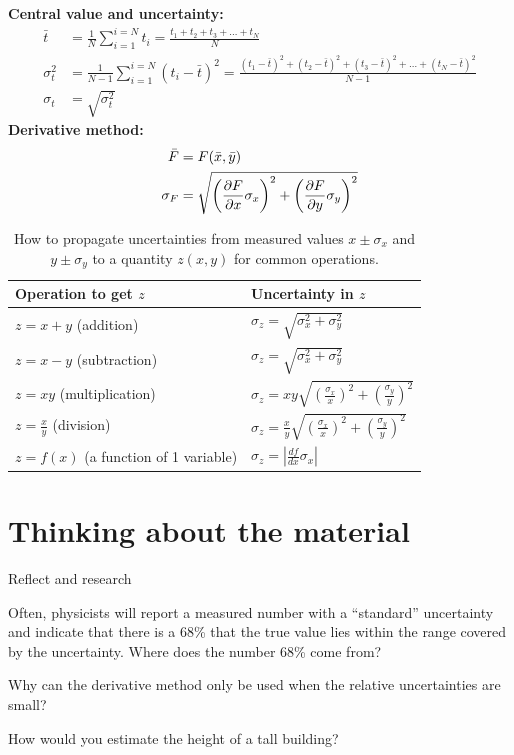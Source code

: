 \begin{importantEquations}
\textbf{Central value and uncertainty:}\\
\begin{align*}
\bar t &= \frac{1}{N}\sum_{i=1}^{i=N} t_i=\frac{t_1 +t_2 +t_3 +\dots+ t_N}{N} \\
\sigma_t^2 &=\frac{1}{N-1}\sum_{i=1}^{i=N}(t_i-\bar t)^2 = \frac{(t_1-\bar t)^2+(t_2-\bar t)^2+(t_3-\bar t)^2+\dots+(t_N-\bar t)^2}{N-1} \\
\sigma_t &=\sqrt{\sigma_t^2}
\end{align*}
\textbf{Derivative method:}\\
\begin{align*}
\bar F &= F(\bar x, \bar y) \nonumber \\
\sigma_F &= \sqrt{\left(\frac{\partial F}{\partial x}\sigma_x \right)^2 + \left(\frac{\partial F}{\partial y}\sigma_y \right)^2 }
\end{align*}
\begin{table}[H]
\centering
\begin{tabular}{ll}
\textbf{Operation to get $z$} &\textbf{Uncertainty in $z$} \\
\hline
\hline
$z=x+y$ (addition) &  $\sigma_z=\sqrt{\sigma_x^2+\sigma_y^2}$ \\ \hline
$z=x-y$ (subtraction) & $\sigma_z=\sqrt{\sigma_x^2+\sigma_y^2}$ \\ \hline
$z=xy$ (multiplication) & $\sigma_z=xy\sqrt{\left(\frac{\sigma_x}{x}\right)^2+\left(\frac{\sigma_y}{y}\right)^2}$ \\ \hline
$z=\frac{x}{y}$ (division) & $\sigma_z=\frac{x}{y}\sqrt{\left(\frac{\sigma_x}{x}\right)^2+\left(\frac{\sigma_y}{y}\right)^2}$ \\ \hline
$z=f(x)$ (a function of 1 variable) &$\sigma_z=\left|\frac{df}{dx}\sigma_x \right|$ \\ \hline
\end{tabular}
\caption{\label{tab:modelandexperiment:prop_uncertainties} How to propagate uncertainties from measured values $x\pm\sigma_x$ and $y\pm\sigma_y$ to a quantity $z(x,y)$ for common operations.}
\end{table}
\end{importantEquations}
\newpage
\section{Thinking about the material}

\vspace{0.5cm}
\begin{chapteractivity}{Reflect and research}
{
\item Often, physicists will report a measured number with a ``standard'' uncertainty and indicate that there is a 68\% that the true value lies within the range covered by the uncertainty. Where does the number 68\% come from?
\item Why can the derivative method only be used when the relative uncertainties are small?
\item How would you estimate the height of a tall building?
}
\end{chapteractivity}

